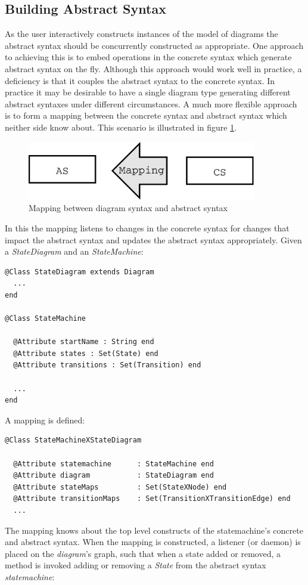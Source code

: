 
\subsection{Building Abstract Syntax}

As the user interactively constructs instances of the model of diagrams the abstract syntax should be concurrently constructed as appropriate.  One approach to achieving this is to embed operations in the concrete syntax which generate abstract syntax on the fly.  Although this approach would work well in practice, a deficiency is that it couples the abstract syntax to the concrete syntax.  In practice it may be desirable to have a single diagram
type generating different abstract syntaxes under different circumstances.  A much more flexible approach is to form a mapping between the concrete syntax and abstract syntax which neither side know about.  This scenario is illustrated in figure
\ref{uniDirMapping}.

\begin{figure}[htb]
\begin{center}
\includegraphics[width=10cm]{ConcreteSyntax/figures/uniDirMapping.pdf}
\caption{Mapping between diagram syntax and abstract syntax}
\label{uniDirMapping}
\end{center}
\end{figure}

In this the mapping listens to changes in the concrete syntax for changes that impact the abstract syntax and updates the abstract syntax appropriately.  Given a \emph{StateDiagram} and an
\emph{StateMachine}:


\begin{lstlisting}
@Class StateDiagram extends Diagram
  ...
end

@Class StateMachine

  @Attribute startName : String end
  @Attribute states : Set(State) end
  @Attribute transitions : Set(Transition) end

  ...
end
\end{lstlisting}\noindent A mapping is defined:

\begin{lstlisting}
@Class StateMachineXStateDiagram

  @Attribute statemachine      : StateMachine end
  @Attribute diagram           : StateDiagram end
  @Attribute stateMaps         : Set(StateXNode) end
  @Attribute transitionMaps    : Set(TransitionXTransitionEdge) end
  ...
\end{lstlisting}
\noindent The mapping knows about the top level constructs of the statemachine's concrete and abstract syntax.  When the mapping is constructed, a listener (or daemon) is placed on the \emph{diagram}'s graph, such that when a state added or removed, a method is invoked adding or removing a \emph{State} from the abstract syntax \emph{statemachine}:


